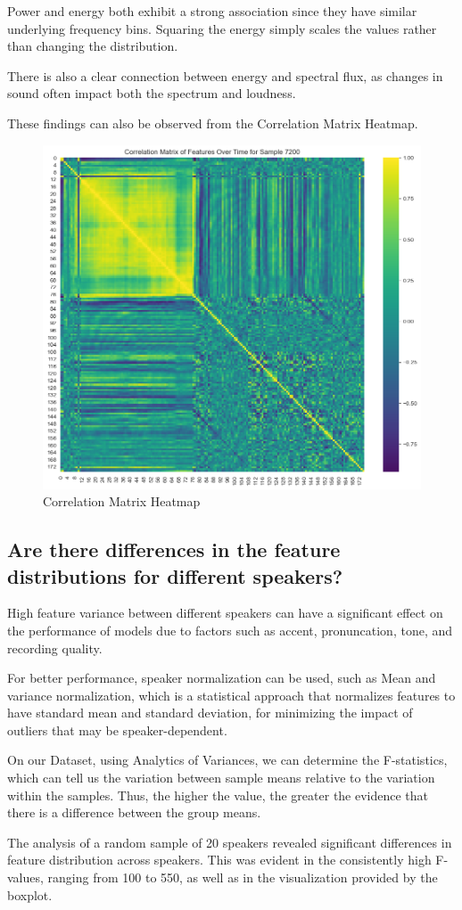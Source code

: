 \documentclass{article}
\begin{document}
Power and energy both exhibit a strong association since they have similar underlying frequency bins. Squaring the energy simply scales the values rather than changing the distribution.

There is also a clear connection between energy and spectral flux, as changes in sound often impact both the spectrum and loudness.

These findings can also be observed from the Correlation Matrix Heatmap.

\begin{figure}[ht]
\centering
\includegraphics[width=0.4\linewidth]{IMG/3b.png}
\caption{Correlation Matrix Heatmap}
\label{fig:3b}
\end{figure}

\subsection{Are there differences in the feature distributions for different speakers?}
High feature variance between different speakers can have a significant effect on the performance of models due to factors such as accent, pronuncation, tone, and recording quality.

For better performance, speaker normalization can be used, such as Mean and variance normalization, which is a statistical approach that normalizes features to have standard mean and standard deviation, for minimizing the impact of outliers that may be speaker-dependent.

On our Dataset, using Analytics of Variances, we can determine the F-statistics, which can tell us the variation between sample means relative to the variation within the samples. Thus, the higher the value, the greater the evidence that there is a difference between the group means.

The analysis of a random sample of 20 speakers revealed significant differences in feature distribution across speakers. This was evident in the consistently high F-values, ranging from 100 to 550, as well as in the visualization provided by the boxplot.
\end{document}
